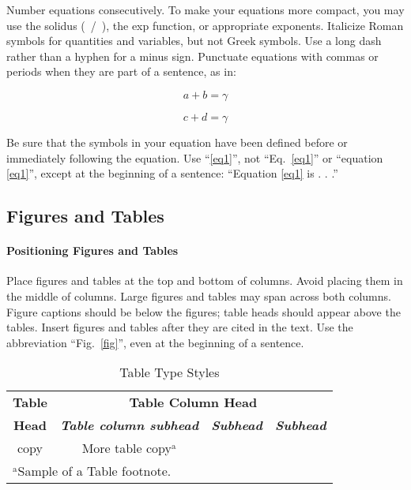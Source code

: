 \documentclass[conference]{IEEEtran}
\begin{document}
Number equations consecutively. To make your 
equations more compact, you may use the solidus (~/~), the exp function, or 
appropriate exponents. Italicize Roman symbols for quantities and variables, 
but not Greek symbols. Use a long dash rather than a hyphen for a minus 
sign. Punctuate equations with commas or periods when they are part of a 
sentence, as in:

\begin{equation}
a+b=\gamma\label{eq1}
\end{equation}

\begin{equation}
c+d=\gamma\label{eq2}
\end{equation}

Be sure that the 
symbols in your equation have been defined before or immediately following 
the equation. Use ``\eqref{eq1}'', not ``Eq.~\eqref{eq1}'' or ``equation \eqref{eq1}'', except at 
the beginning of a sentence: ``Equation \eqref{eq1} is . . .''

\subsection{Figures and Tables}

\paragraph{Positioning Figures and Tables} Place figures and tables at the top and 
bottom of columns. Avoid placing them in the middle of columns. Large 
figures and tables may span across both columns. Figure captions should be 
below the figures; table heads should appear above the tables. Insert 
figures and tables after they are cited in the text. Use the abbreviation 
``Fig.~\ref{fig}'', even at the beginning of a sentence.

\begin{table}[htbp]
\caption{Table Type Styles}
\begin{center}
\begin{tabular}{|c|c|c|c|}
\hline
\textbf{Table}&\multicolumn{3}{|c|}{\textbf{Table Column Head}} \\
\cline{2-4} 
\textbf{Head} & \textbf{\textit{Table column subhead}}& \textbf{\textit{Subhead}}& \textbf{\textit{Subhead}} \\
\hline
copy& More table copy$^{\mathrm{a}}$& &  \\
\hline
\multicolumn{4}{l}{$^{\mathrm{a}}$Sample of a Table footnote.}
\end{tabular}
\label{tab1}
\end{center}
\end{table}
\end{document}
